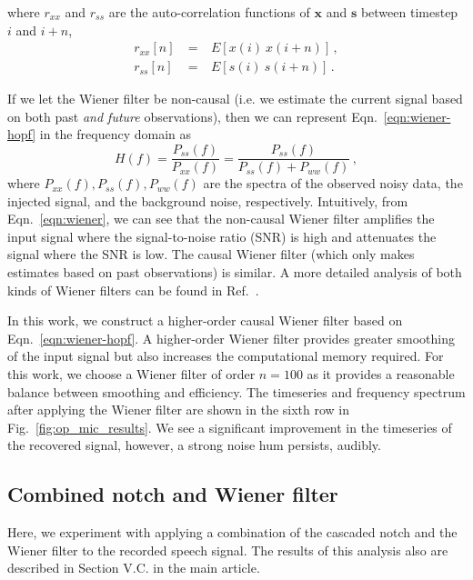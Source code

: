 \documentclass[aps,pra,superscriptaddress,reprint]{revtex4-2}
\begin{document}
where $r_{xx}$ and $r_{ss}$ are the auto-correlation functions of $\mathbf{x}$ and $\mathbf{s}$ between timestep $i$ and $i+n$, 
\begin{eqnarray} 
r_{xx}[n] &~=~& E[x(i)~x(i+n)] \,,\\
r_{ss}[n] &~=~& E[s(i)~s(i+n)] \,.
\end{eqnarray} 



If we let the Wiener filter be non-causal (i.e. we estimate the current signal based on both past \emph{and future} observations), then we can represent Eqn.~\ref{eqn:wiener-hopf} in the frequency domain as
\begin{equation}
\label{eqn:wiener}
    H(f)=\frac{P_{ss}(f)}{P_{xx}(f)}=\frac{P_{ss}(f)}{P_{ss}(f)+P_{ww}(f)}\,,
\end{equation}
where $P_{xx}(f), P_{ss}(f), P_{ww}(f)$ are the spectra of the observed noisy data, the injected signal, and the background noise, respectively. Intuitively, from Eqn.~\ref{eqn:wiener}, we can see that the non-causal Wiener filter amplifies the input signal where the signal-to-noise ratio (SNR) is high and attenuates the signal where the SNR is low. The causal Wiener filter (which only makes estimates based on past observations) is similar. A more detailed analysis of both kinds of Wiener filters can be found in Ref.~\citep{10.5555/151045}.


In this work, we construct a higher-order causal Wiener filter based on Eqn.~\ref{eqn:wiener-hopf}. A higher-order Wiener filter provides greater smoothing of the input signal but also increases the computational memory required. For this work, we choose a Wiener filter of order $n=100$ as it provides a reasonable balance between smoothing and efficiency. The timeseries and frequency spectrum after applying the Wiener filter are shown in the sixth row in Fig.~\ref{fig:op_mic_results}.
We see a significant improvement in the timeseries of the recovered signal, however, a strong noise hum persists, audibly. 


\subsection{Combined notch and Wiener filter}

Here, we experiment with applying a combination of the cascaded notch and the Wiener filter to the recorded speech signal. 
The results of this analysis also are described in Section V.C. in the main article. 
\end{document}
